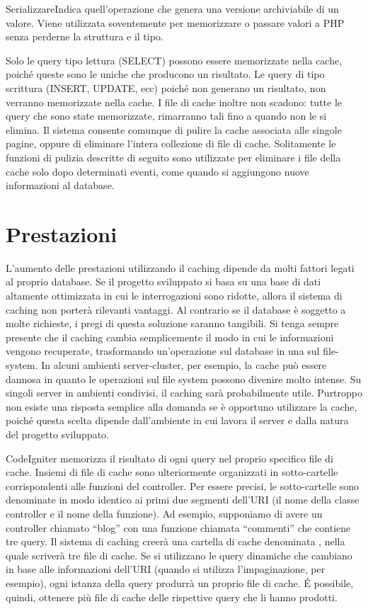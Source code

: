 \begin{deftabv}{Serializzare}{Indica quell'operazione che genera una versione archiviabile di un valore. Viene utilizzata soventemente per memorizzare o passare valori a PHP senza perderne la struttura e il tipo.}
\end{deftabv}

Solo le query tipo lettura (SELECT) possono essere memorizzate nella cache, poiché queste sono le uniche che producono un risultato. Le query di tipo scrittura (INSERT, UPDATE, ecc) poiché non generano un risultato, non verranno memorizzate nella cache. I file di cache inoltre non scadono: tutte le query che sono state memorizzate, rimarranno tali fino a quando non le si elimina. Il sistema consente comunque di pulire la cache associata alle singole pagine, oppure di eliminare l'intera collezione di file di cache. Solitamente le funzioni di pulizia descritte di seguito sono utilizzate per eliminare i file della cache solo dopo determinati eventi, come quando si aggiungono nuove informazioni al database.

\section*{Prestazioni}
L'aumento delle prestazioni utilizzando il caching dipende da molti fattori legati al proprio database. Se il progetto sviluppato si basa su una base di dati altamente ottimizzata in cui le interrogazioni sono ridotte, allora il sistema di caching non porterà rilevanti vantaggi. Al contrario se il database è soggetto a molte richieste, i pregi di questa soluzione saranno tangibili. Si tenga sempre presente che il caching cambia semplicemente il modo in cui le informazioni vengono recuperate, trasformando un'operazione sul database in una sul file-system. In alcuni ambienti server-cluster, per esempio, la cache può essere dannosa in quanto le operazioni sul file system possono divenire molto intense. Su singoli server in ambienti condivisi, il caching sarà probabilmente utile. Purtroppo non esiste una risposta semplice alla domanda se è opportuno utilizzare la cache, poiché questa scelta dipende dall'ambiente in cui lavora il server e dalla natura del progetto sviluppato.

CodeIgniter memorizza il risultato di ogni query nel proprio specifico file di cache. Insiemi di file di cache sono ulteriormente organizzati in sotto-cartelle corrispondenti alle funzioni del controller. Per essere precisi, le sotto-cartelle sono denominate in modo identico ai primi due segmenti dell'\ac{URI} (il nome della classe controller e il nome della funzione). Ad esempio, supponiamo di avere un controller chiamato ``blog'' con una funzione chiamata ``commenti'' che contiene tre query. Il sistema di caching creerà una cartella di cache denominata , nella quale scriverà tre file di cache. Se si utilizzano le query dinamiche che cambiano in base alle informazioni dell'\ac{URI} (quando si utilizza l'impaginazione, per esempio), ogni istanza della query produrrà un proprio file di cache. \'E possibile, quindi, ottenere più file di cache delle rispettive query che li hanno prodotti.

